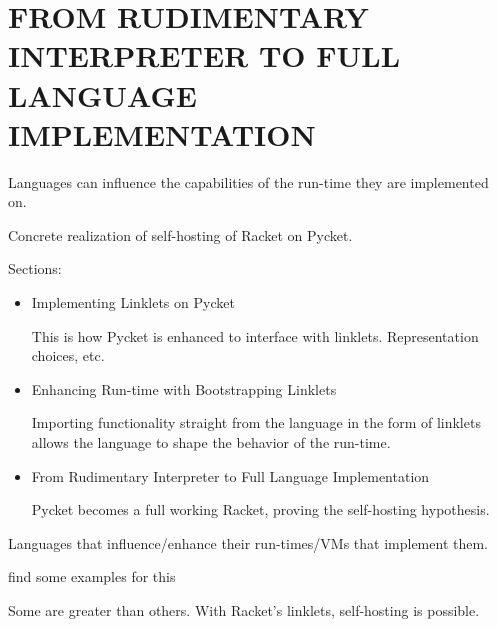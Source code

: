 \chapter[\texorpdfstring{FROM RUDIMENTARY INTERPRETER TO FULL LANGUAGE IMPLEMENTATION}
                          {4. Pycket as Full Racket}]{FROM RUDIMENTARY INTERPRETER TO FULL LANGUAGE IMPLEMENTATION}
	\label{chapter:pycket}

	\begin{chaptersynopsis}

        Languages can influence the capabilities of the run-time they are implemented on.

		Concrete realization of self-hosting of Racket on Pycket.

        \vspace{2em}

        Sections:
		\begin{itemize}
			\item Implementing Linklets on Pycket

			This is how Pycket is enhanced to interface with linklets. Representation choices, etc.

			\item Enhancing Run-time with Bootstrapping Linklets

			Importing functionality straight from the language in the form of linklets allows the language to shape the behavior of the run-time.

			\item From Rudimentary Interpreter to Full Language Implementation

			Pycket becomes a full working Racket, proving the self-hosting hypothesis.

		\end{itemize}
    \end{chaptersynopsis}

	\begin{paragraph-here}%
		Languages that influence/enhance their run-times/VMs that implement them.

		\begin{todo}
			find some examples for this
		\end{todo}
	\end{paragraph-here}

	\begin{paragraph-here}%
		Some are greater than others. With Racket's linklets, self-hosting is possible.
	\end{paragraph-here}

